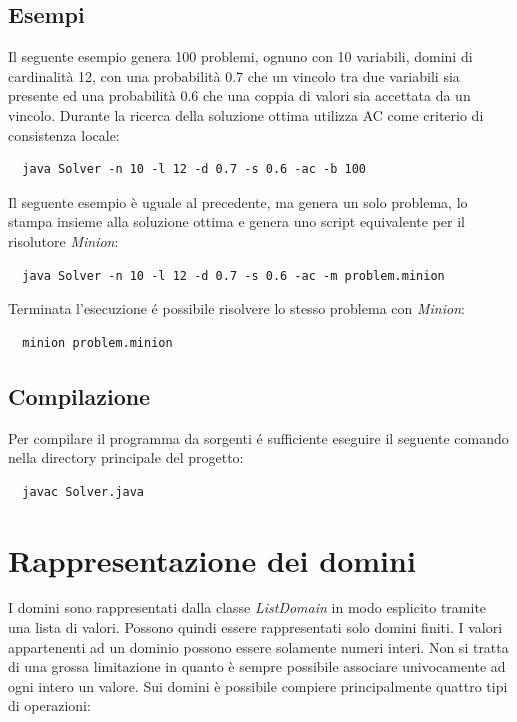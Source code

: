 \documentclass[a4paper,12pt,italian]{article}
\begin{document}
\subsection{Esempi}

Il seguente esempio genera 100 problemi, ognuno con 10 variabili,
domini di cardinalit\`a 12, con una probabilit\`a 0.7 che un vincolo
tra due variabili sia presente ed una probabilit\`a 0.6 che una coppia
di valori sia accettata da un vincolo. Durante la ricerca della
soluzione ottima utilizza AC come criterio di consistenza locale:

\begin{verbatim}
  java Solver -n 10 -l 12 -d 0.7 -s 0.6 -ac -b 100
\end{verbatim}

Il seguente esempio \`e uguale al precedente, ma genera un solo
problema, lo stampa insieme alla soluzione ottima e genera uno script
equivalente per il risolutore \textit{Minion}:

\begin{verbatim}
  java Solver -n 10 -l 12 -d 0.7 -s 0.6 -ac -m problem.minion
\end{verbatim}

Terminata l'esecuzione \'e possibile risolvere lo stesso problema con
\textit{Minion}:

\begin{verbatim}
  minion problem.minion
\end{verbatim}

\subsection{Compilazione}

Per compilare il programma da sorgenti \'e sufficiente eseguire il
seguente comando nella directory principale del progetto:

\begin{verbatim}
  javac Solver.java
\end{verbatim}

\section{Rappresentazione dei domini}

I domini sono rappresentati dalla classe \textit{ListDomain} in modo
esplicito tramite una lista di valori. Possono quindi essere
rappresentati solo domini finiti. I valori appartenenti ad un dominio
possono essere solamente numeri interi. Non si tratta di una grossa
limitazione in quanto \`e sempre possibile associare univocamente ad
ogni intero un valore. Sui domini \`e possibile compiere
principalmente quattro tipi di operazioni:
\end{document}
